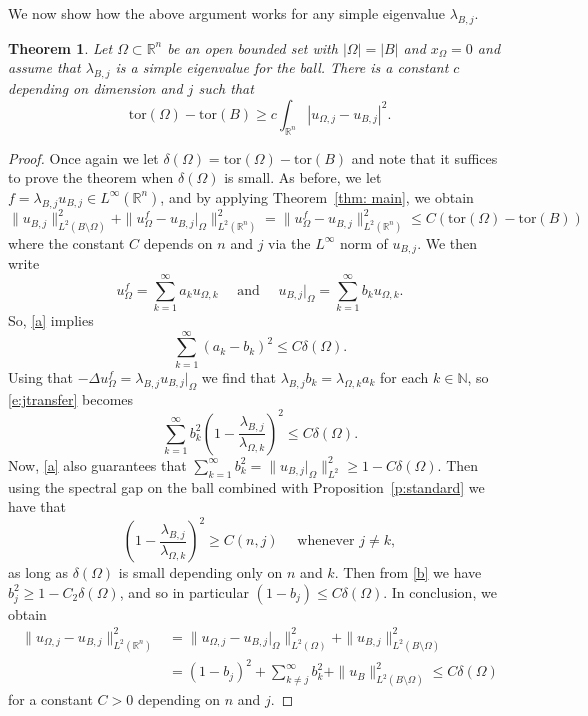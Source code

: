 \documentclass[10pt, reqno]{amsart}
\numberwithin{equation}{section}
\newtheorem{theorem}{Theorem}[section]
\def\W{\Omega}
\def\tor{\mathrm{tor}}
\begin{document}
We now show how the above argument works for any simple eigenvalue $\lambda_{B,j}$. 
\begin{theorem} \label{t:second}
 Let $\W\subset \mathbb{R}^n$ be an open bounded set with $|\W|=|B|$ and $x_\W =0$ and assume that $\lambda_{B,j}$ is a simple eigenvalue for the ball. There is a constant $c$ depending on dimension and $j$ such that 
 \[
 \tor(\W)-\tor(B) \geq c \int_{\mathbb{R}^n} |u_{\W, j}-u_{B, j}|^2. 
 \]
\end{theorem}

\begin{proof}
Once again we let $\delta(\W)=\tor(\W)-\tor(B)$ and note that it suffices to prove the theorem when $\delta(\W)$ is small.
As before, we let $f= \lambda_{B,j} u_{B,j} \in L^\infty(\mathbb{R}^n)$, and by applying Theorem~\ref{thm: main}, we obtain 
\begin{equation}
    \label{a}
\|u_{B,j} \|^2_{L^2(B \setminus \W)} +  \| u_{\W}^f - u_{B,j} \big|_{\W}
\|^2_{L^2(\mathbb{R}^n)} =   \| u_{\W}^f - u_{B,j} \|^2_{L^2(\mathbb{R}^n)} \leq C (\tor(\W)-\tor(B)) 
\end{equation}
where the constant $C$ depends on $n$ and $j$ via the $L^\infty$ norm of $u_{B,j}$. We then write
\[
u_{\W}^f = \sum_{k=1}^{\infty} a_k u_{\W,k}
\quad \text{ and } \quad  
u_{B, j} \big|_{\W} = \sum_{k=1}^{\infty} b_k u_{\W,k}. 
\]
So, \eqref{a} implies
\begin{equation} \label{e:jtransfer}
\sum_{k=1}^{\infty} (a_k - b_k)^2 \leq C \delta(\W). 
\end{equation}
Using that $-\Delta u_{\W}^f = \lambda_{B,j} u_{B,j} \big|_{\W}$ we find that $\lambda_{B,j} b_k = \lambda_{\W,k} a_k$ for each $k \in \mathbb{N}$, so \eqref{e:jtransfer} becomes
\begin{equation}\label{b}
\sum_{k=1}^{\infty} b_k^2 \left(1 - \frac{\lambda_{B,j}}{\lambda_{\W,k}} \right)^2 \leq C \delta(\W). 
\end{equation}
Now, \eqref{a} also guarantees that $\sum_{k=1}^{\infty} b_k^2 = \|u_{B,j}\big|_{\W} \|_{L^2}^2\geq 1 - C \delta(\W)$.
Then using the spectral gap on the ball combined with Proposition~\ref{p:standard} we have that
\[
\left(1 - \frac{\lambda_{B,j}}{\lambda_{\W,k}} \right)^2 \geq C(n,j) \quad \text{ whenever } j \neq k,
\]
as long as $\delta(\W)$ is small depending only on $n$ and $k$.
Then from \eqref{b} we have $
b_j^2 \geq 1 - C_2 \delta(\W)$, and so in particular $(1-b_j) \leq C \delta(\W)$.
In conclusion, we obtain 
\[
\begin{aligned}
\| u_{\W,j} - u_{B,j} \|_{L^2(\mathbb{R}^n)}^2 
&=\| u_{\W,j} - u_{B,j} \big|_{\W} \|_{L^2(\W)}^2 + \|u_{B,j} \|^2_{L^2(B \setminus \W)} \\
&=(1-b_j)^2 + \sum_{k\neq j}^{\infty} b_k^2 + \|u_B \|^2_{L^2(B \setminus \W)} \leq C \delta(\W) 
\end{aligned}
\]
for a constant $C>0$ depending on $n$ and $j$.
\end{proof}
\end{document}
